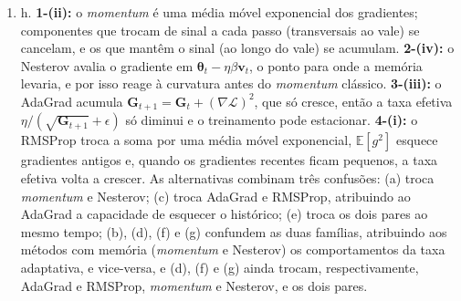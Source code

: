 \documentclass{dlproblemset}
\begin{document}
\begin{enumerate}[1)]
    \item h. \textbf{1-(ii):} o \textit{momentum} é uma média móvel exponencial dos gradientes; componentes que trocam de sinal a cada passo (transversais ao vale) se cancelam, e os que mantêm o sinal (ao longo do vale) se acumulam. \textbf{2-(iv):} o Nesterov avalia o gradiente em $\boldsymbol{\theta}_t - \eta\beta\mathbf{v}_t$, o ponto para onde a memória levaria, e por isso reage à curvatura antes do \textit{momentum} clássico. \textbf{3-(iii):} o AdaGrad acumula $\mathbf{G}_{t+1} = \mathbf{G}_t + (\nabla\mathcal{L})^2$, que só cresce, então a taxa efetiva $\eta/(\sqrt{\mathbf{G}_{t+1}} + \epsilon)$ só diminui e o treinamento pode estacionar. \textbf{4-(i):} o RMSProp troca a soma por uma média móvel exponencial, $\mathbb{E}[g^2]$ esquece gradientes antigos e, quando os gradientes recentes ficam pequenos, a taxa efetiva volta a crescer. As alternativas combinam três confusões: (a) troca \textit{momentum} e Nesterov; (c) troca AdaGrad e RMSProp, atribuindo ao AdaGrad a capacidade de esquecer o histórico; (e) troca os dois pares ao mesmo tempo; (b), (d), (f) e (g) confundem as duas famílias, atribuindo aos métodos com memória (\textit{momentum} e Nesterov) os comportamentos da taxa adaptativa, e vice-versa, e (d), (f) e (g) ainda trocam, respectivamente, AdaGrad e RMSProp, \textit{momentum} e Nesterov, e os dois pares.


\end{enumerate}
\end{document}
